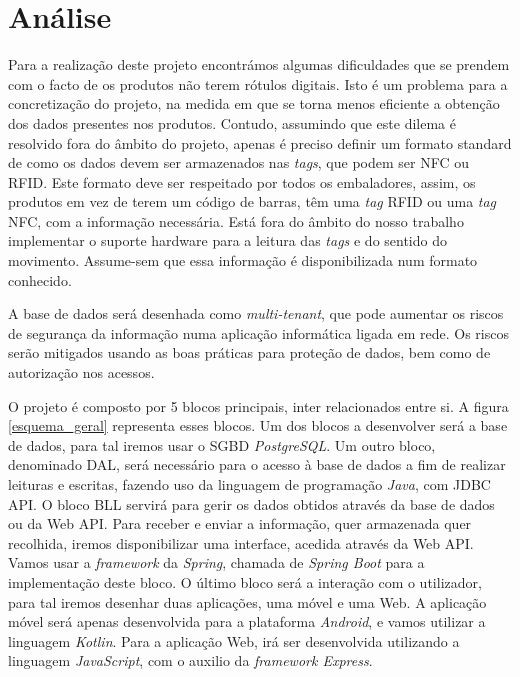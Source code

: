 %
%
\section*{Análise} \label{Analise}

Para a realização deste projeto encontrámos algumas dificuldades que se prendem com o facto de os produtos não terem rótulos digitais. Isto é um problema para a concretização do projeto, na medida em que se torna menos eficiente a obtenção dos dados presentes nos produtos. Contudo, assumindo que este dilema é resolvido fora do âmbito do projeto, apenas é preciso definir um formato standard de como os dados devem ser armazenados nas \textit{tags}, que podem ser NFC ou RFID. Este formato deve ser respeitado por todos os embaladores, assim, os produtos em vez de terem um código de barras, têm uma \textit{tag} RFID ou uma \textit{tag} NFC, com a informação necessária. Está fora do âmbito do nosso trabalho implementar o suporte hardware para a leitura das \textit{tags} e do sentido do movimento. Assume-sem que essa informação é disponibilizada num formato conhecido. 

A base de dados será desenhada como \textit{multi-tenant}, que pode aumentar os riscos de segurança da informação numa aplicação informática ligada em rede. Os riscos serão mitigados usando as boas práticas para proteção de dados, bem como de autorização nos acessos.

O projeto é composto por 5 blocos principais, inter relacionados entre si. A figura \ref{esquema_geral} representa esses blocos. Um dos blocos a desenvolver será a base de dados, para tal iremos usar o SGBD \textit{PostgreSQL}. Um outro bloco, denominado DAL, será necessário para o acesso à base de dados a fim de realizar leituras e escritas, fazendo uso da linguagem de programação \textit{Java}, com JDBC API. O bloco BLL servirá para gerir os dados obtidos através da base de dados ou da Web API. Para receber e enviar a informação, quer armazenada quer recolhida, iremos disponibilizar uma interface, acedida através da Web API. Vamos usar a \textit{framework} da \textit{Spring}, chamada de \textit{Spring Boot} para a implementação deste bloco. O último bloco será a interação com o utilizador, para tal iremos desenhar duas aplicações, uma móvel e uma Web. A aplicação móvel será apenas desenvolvida para a plataforma \textit{Android}, e vamos utilizar a linguagem \textit{Kotlin}. Para a aplicação Web, irá ser desenvolvida utilizando a linguagem \textit{JavaScript}, com o auxilio da \textit{framework Express}.


